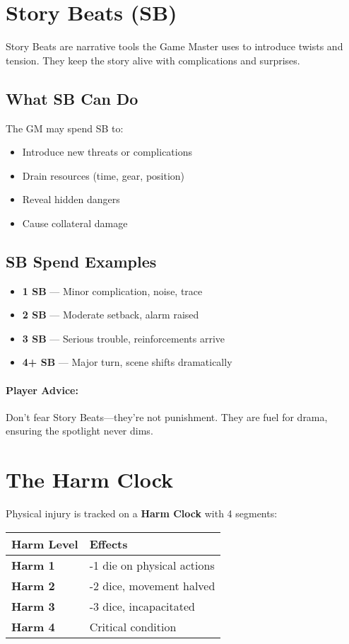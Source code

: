 \begin{multicols}{2}
\section{Story Beats (SB)} 

Story Beats are narrative tools the Game Master uses to introduce twists and tension. They keep the story alive with complications and surprises.

\subsection*{What SB Can Do}
The GM may spend SB to:
\begin{itemize}
  \item Introduce new threats or complications
  \item Drain resources (time, gear, position)
  \item Reveal hidden dangers
  \item Cause collateral damage
\end{itemize}

\subsection*{SB Spend Examples}
\begin{itemize}
  \item \textbf{1 SB} — Minor complication, noise, trace
  \item \textbf{2 SB} — Moderate setback, alarm raised
  \item \textbf{3 SB} — Serious trouble, reinforcements arrive
  \item \textbf{4+ SB} — Major turn, scene shifts dramatically
\end{itemize}

\paragraph{Player Advice:}  
Don’t fear Story Beats—they’re not punishment. They are fuel for drama, ensuring the spotlight never dims.

\section{The Harm Clock} 

Physical injury is tracked on a \textbf{Harm Clock} with 4 segments:

\begin{center}
\small
\begin{tabular}{ll}
\toprule
\textbf{Harm Level} & \textbf{Effects} \\
\midrule
\textbf{Harm 1} & -1 die on physical actions \\
\textbf{Harm 2} & -2 dice, movement halved \\
\textbf{Harm 3} & -3 dice, incapacitated \\
\textbf{Harm 4} & Critical condition \\
\bottomrule
\end{tabular}
\end{center}


\end{multicols}
